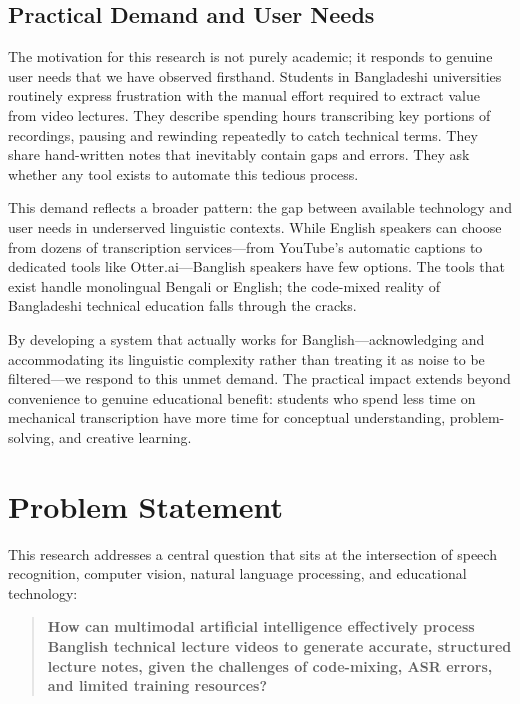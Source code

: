 \subsection{Practical Demand and User Needs}

The motivation for this research is not purely academic; it responds to genuine user needs that we have observed firsthand. Students in Bangladeshi universities routinely express frustration with the manual effort required to extract value from video lectures. They describe spending hours transcribing key portions of recordings, pausing and rewinding repeatedly to catch technical terms. They share hand-written notes that inevitably contain gaps and errors. They ask whether any tool exists to automate this tedious process.

This demand reflects a broader pattern: the gap between available technology and user needs in underserved linguistic contexts. While English speakers can choose from dozens of transcription services---from YouTube's automatic captions to dedicated tools like Otter.ai---Banglish speakers have few options. The tools that exist handle monolingual Bengali or English; the code-mixed reality of Bangladeshi technical education falls through the cracks.

By developing a system that actually works for Banglish---acknowledging and accommodating its linguistic complexity rather than treating it as noise to be filtered---we respond to this unmet demand. The practical impact extends beyond convenience to genuine educational benefit: students who spend less time on mechanical transcription have more time for conceptual understanding, problem-solving, and creative learning.

\section{Problem Statement}

This research addresses a central question that sits at the intersection of speech recognition, computer vision, natural language processing, and educational technology:

\begin{quote}
\textbf{How can multimodal artificial intelligence effectively process Banglish technical lecture videos to generate accurate, structured lecture notes, given the challenges of code-mixing, ASR errors, and limited training resources?}
\end{quote}

